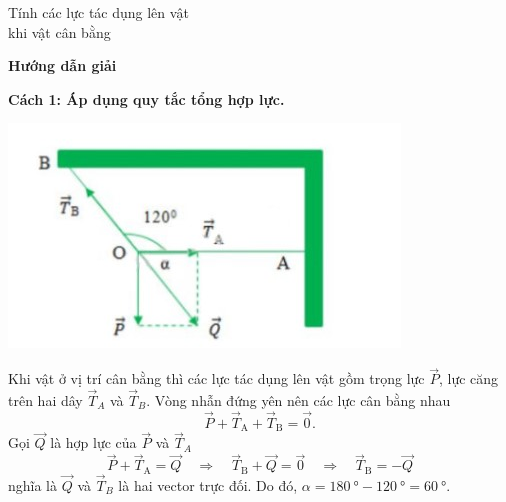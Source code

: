 \begin{dang}{Tính các lực tác dụng lên vật \\khi vật cân bằng}
	{	\begin{center}
			\textbf{Hướng dẫn giải}
		\end{center}
		\textbf{Cách 1: Áp dụng quy tắc tổng hợp lực.}
		\begin{center}
			\includegraphics[scale=0.8]{../figs/VN10-PH-11-L-008-4-V2-02.jpg}
		\end{center}
		Khi vật ở vị trí cân bằng thì các lực tác dụng lên vật gồm trọng lực $\vec{P}$, lực căng trên hai dây $\vec{T}_A$ và $\vec{T}_B$. Vòng nhẫn đứng yên nên các lực cân bằng nhau
		$$\vec{P}+\vec{T}_\textrm{A}+\vec{T}_\textrm{B}=\vec{0}.$$
		Gọi $\vec{Q}$ là hợp lực của $\vec{P}$ và $\vec{T}_A$
		$$\vec{P}+\vec{T}_\textrm{A}=\vec{Q}\quad\Rightarrow \quad\vec{T}_\textrm{B}+\vec{Q}=\vec{0}\quad\Rightarrow\quad \vec{T}_\textrm{B}=-\vec{Q}$$
		nghĩa là $\vec{Q}$ và $\vec{T}_B$ là hai vector trực đối. Do đó, $\alpha =\SI{	180}{\degree}-\SI{120}{\degree}=\SI{60}{\degree}.$
		
}
\end{dang}
